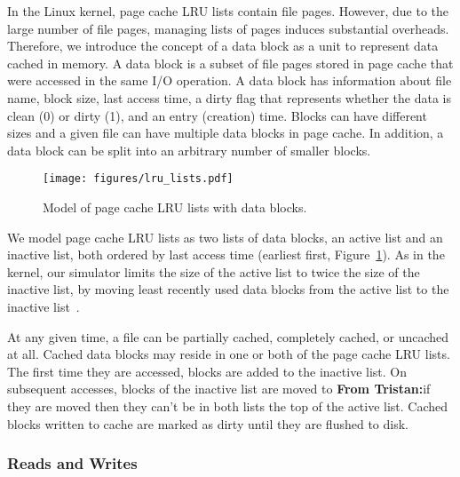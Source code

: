 \documentclass[conference]{IEEEtran}
\newcommand{\tristan}[1]{\color{orange}\textbf{From Tristan:}#1\color{black}}
\begin{document}
    In the Linux kernel, page cache LRU lists contain file pages. However, 
    due to the large number of file pages, managing lists of pages 
    induces substantial overheads.
    Therefore, we introduce the concept of a data block as a unit to represent data 
    cached in memory. A data block is a subset of file pages stored in
    page cache that were accessed in the same I/O operation. 
    A data block has information about file name, block size, last access 
    time, a dirty flag that represents whether the data is clean (0) 
    or dirty (1), and an entry (creation) time.
    Blocks can have different sizes and a given file can have multiple 
    data blocks in page cache. In addition, a data block can be split into an 
    arbitrary number of smaller blocks.
    \begin{figure}
           \centering
           \texttt{[image: figures/lru\_lists.pdf]}
           \caption{Model of page cache LRU lists with data blocks.}    \label{fig:lrulist}
    \end{figure}    
    
    We model page cache LRU lists as 
    two lists of data blocks, an active list and an inactive list, both ordered by 
    last access time (earliest first, Figure~\ref{fig:lrulist}).
    As in the kernel, our simulator limits the size of the active list to
    twice the size of the inactive list, by moving least recently 
    used data blocks from the active list to the inactive list~\cite{gorman2004understanding, linuxdev3rd2010}.

    At any given time, a file can be partially cached, completely cached,
    or uncached at all. Cached data blocks may reside in one or both of the
    page cache LRU lists. The first time they are accessed, blocks are
    added to the inactive list. On subsequent accesses, blocks of the
    inactive list are moved to \tristan{if they are moved then they can't
    be in both lists} the top of the active list. Cached blocks written to
    cache are marked as dirty until they are flushed to disk.

    \subsubsection{Reads and Writes}
\end{document}

